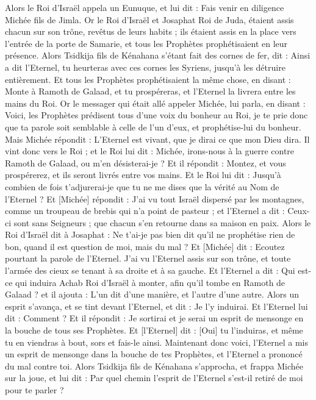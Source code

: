 \begin{multicols}{2}
Alors le Roi d'Israël appela un Eunuque, et lui dit : Fais venir en diligence Michée fils de Jimla.
Or le Roi d'Israël et Josaphat Roi de Juda, étaient assis chacun sur son trône, revêtus de leurs habits ; ils étaient assis en la place vers l'entrée de la porte de Samarie, et tous les Prophètes prophétisaient en leur présence.
Alors Tsidkija fils de Kénahana s'étant fait des cornes de fer, dit : Ainsi a dit l'Eternel, tu heurteras avec ces cornes les Syriens, jusqu'à les détruire entièrement.
Et tous les Prophètes prophétisaient la même chose, en disant : Monte à Ramoth de Galaad, et tu prospéreras, et l'Eternel la livrera entre les mains du Roi.
Or le messager qui était allé appeler Michée, lui parla, en disant : Voici, les Prophètes prédisent tous d'une voix du bonheur au Roi, je te prie donc que ta parole soit semblable à celle de l'un d'eux, et prophétise-lui du bonheur.
Mais Michée répondit : L'Eternel est vivant, que je dirai ce que mon Dieu dira.
Il vint donc vers le Roi ; et le Roi lui dit : Michée, irons-nous à la guerre contre Ramoth de Galaad, ou m'en désisterai-je ? Et il répondit : Montez, et vous prospérerez, et ils seront livrés entre vos mains.
Et le Roi lui dit : Jusqu'à combien de fois t'adjurerai-je que tu ne me dises que la vérité au Nom de l'Eternel ?
Et [Michée] répondit : J'ai vu tout Israël dispersé par les montagnes, comme un troupeau de brebis qui n'a point de pasteur ; et l'Eternel a dit : Ceux-ci sont sans Seigneurs ; que chacun s'en retourne dans sa maison en paix.
Alors le Roi d'Israël dit à Josaphat : Ne t'ai-je pas bien dit qu'il ne prophétise rien de bon, quand il est question de moi, mais du mal ?
Et [Michée] dit : Ecoutez pourtant la parole de l'Eternel. J'ai vu l'Eternel assis sur son trône, et toute l'armée des cieux se tenant à sa droite et à sa gauche.
Et l'Eternel a dit : Qui est-ce qui induira Achab Roi d'Israël à monter, afin qu'il tombe en Ramoth de Galaad ? et il ajouta : L'un dit d'une manière, et l'autre d'une autre.
Alors un esprit s'avança, et se tint devant l'Eternel, et dit : Je l'y induirai. Et l'Eternel lui dit : Comment ?
Et il répondit : Je sortirai et je serai un esprit de mensonge en la bouche de tous ses Prophètes. Et [l'Eternel] dit : [Oui] tu l'induiras, et même tu en viendras à bout, sors et fais-le ainsi.
Maintenant donc voici, l'Eternel a mis un esprit de mensonge dans la bouche de tes Prophètes, et l'Eternel a prononcé du mal contre toi.
Alors Tsidkija fils de Kénahana s'approcha, et frappa Michée sur la joue, et lui dit : Par quel chemin l'esprit de l'Eternel s'est-il retiré de moi pour te parler ?

\end{multicols}
